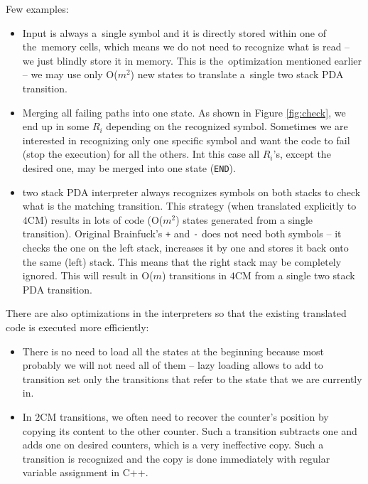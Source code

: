 \documentclass[english,shortabstract,mgr]{iithesis}
\begin{document}
Few examples:
\begin{itemize}
  \item Input is always a~single symbol and it is directly stored within one of the~memory cells,
      which means we do not need to recognize what is read -- we just blindly store it in memory.
      This is the~optimization mentioned earlier -- we may use only O($m^2$) new states to translate
      a~single two stack PDA transition.
  \item Merging all failing paths into one state. As shown in Figure \ref{fig:check},
      we end up in some $R_i$ depending on the recognized symbol.
      Sometimes we are interested in recognizing only one specific symbol
      and want the code to fail (stop the execution) for all the others.
      Int this case all $R_i$'s, except the desired one,
      may be merged into one state (\texttt{END}).
  \item two stack PDA interpreter always recognizes symbols on both stacks
      to check what is the matching transition. This strategy (when translated
      explicitly to $4$CM) results in lots of code (O($m^2$) states generated
      from a single transition). Original Brainfuck's \texttt{+} and \texttt{-}
      does not need both symbols -- it checks the one on the left stack,
      increases it by one and stores it back onto the same (left) stack.
      This means that the right stack may be completely ignored. This will
      result in O($m$) transitions in $4$CM from a single two stack PDA transition.
\end{itemize}


There are also optimizations in the interpreters so that the existing
translated code is executed more efficiently:

\begin{itemize}
\item There is no need to load all the states at the beginning because most probably we will
      not need all of them -- lazy loading allows to add to transition set
      only the transitions that refer to the state that we are currently in.
  \item In $2$CM transitions, we often need to recover the counter's position by
      copying its content to the other counter. Such a transition subtracts
      one and adds one on desired counters, which is a very ineffective copy.
      Such a transition is recognized and the copy is done immediately with
      regular variable assignment in C++.
\end{itemize}
\end{document}
